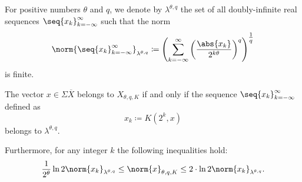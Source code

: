 \begin{definition}\label{def:discrete_k_interpolation_space}
  For positive numbers \( \theta \) and \( q \), we denote by \( \lambda^{\theta,q} \) the set of all doubly-infinite real sequences \( \seq{ x_k }_{k=-\infty}^\infty \) such that the norm
  \begin{equation}\label{eq:def:discrete_k_interpolation_space}
    \norm{\seq{ x_k }_{k=-\infty}^\infty}_{\lambda^{\theta,q}} \coloneqq \left( \sum_{k=-\infty}^\infty \left( \frac {\abs{x_k}} {2^{k\theta}} \right)^q \right)^{\tfrac 1 q}
  \end{equation}
  is finite.
\end{definition}

\begin{theorem}\label{thm:discrete_k_interpolation}
  The vector \( x \in \Sigma\overline{X} \) belongs to \hyperref[def:k_functional_interpolation_space]{\( X_{\theta,q,K} \)} if and only if the sequence \( \seq{ x_k }_{k=-\infty}^\infty \) defined as
  \begin{equation}\label{eq:thm:discrete_k_interpolation/sequence}
    x_k \coloneqq K(2^k, x)
  \end{equation}
  belongs to \hyperref[def:discrete_k_interpolation_space]{\( \lambda^{\theta,q} \)}.

  Furthermore, for any integer \( k \) the following inequalities hold:
  \begin{equation}\label{eq:thm:discrete_k_interpolation/inequalities}
    \frac 1 {2^\theta} \ln 2 \norm{x_k}_{\lambda^{\theta,q}}
    \leq
    \norm{x}_{\theta,q,K}
    \leq
    2 \cdot \ln 2 \norm{x_k}_{\lambda^{\theta,q}}.
  \end{equation}
\end{theorem}
